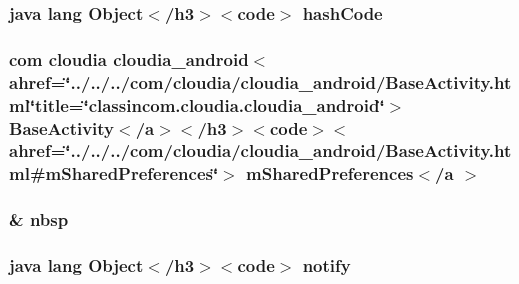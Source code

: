 \hypertarget{_sensor_overview_activity_8html_a8e178e2bb2bef055ea23ea3910a221ca}{
\subsubsection[{hash\-Code}]{\setlength{\rightskip}{0pt plus 5cm}java lang Object$<$/h3$>$$<$code$>$ hash\-Code}}\label{_sensor_overview_activity_8html_a8e178e2bb2bef055ea23ea3910a221ca}
\hypertarget{_sensor_overview_activity_8html_a5b7f2b6398d46c2bac3442c34be02d25}{
\subsubsection[{m\-Shared\-Preferences$<$/a $>$}]{\setlength{\rightskip}{0pt plus 5cm}com cloudia cloudia\-\_\-android$<$ahref=\char`\"{}../../../com/cloudia/cloudia\-\_\-android/Base\-Activity.\-html\char`\"{}title=\char`\"{}classincom.\-cloudia.\-cloudia\-\_\-android\char`\"{}$>$ Base\-Activity$<$/{\bf a}$>$$<$/h3$>$$<$code$>$$<$ahref=\char`\"{}../../../com/cloudia/cloudia\-\_\-android/Base\-Activity.\-html\#m\-Shared\-Preferences\char`\"{}$>$ m\-Shared\-Preferences$<$/{\bf a} $>$}}\label{_sensor_overview_activity_8html_a5b7f2b6398d46c2bac3442c34be02d25}
\hypertarget{_sensor_overview_activity_8html_aef915316f784c9063d942974538301a6}{
\subsubsection[{nbsp}]{\setlength{\rightskip}{0pt plus 5cm}\& nbsp}}\label{_sensor_overview_activity_8html_aef915316f784c9063d942974538301a6}
\hypertarget{_sensor_overview_activity_8html_ae99ae10b5010594dbda4794e02db271b}{
\subsubsection[{notify}]{\setlength{\rightskip}{0pt plus 5cm}java lang Object$<$/h3$>$$<$code$>$ notify}}\label{_sensor_overview_activity_8html_ae99ae10b5010594dbda4794e02db271b}

